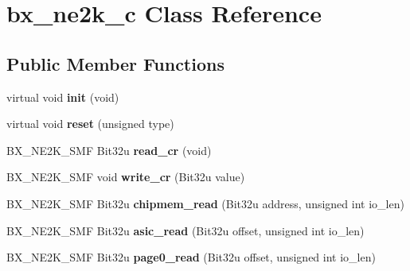 \hypertarget{classbx__ne2k__c}{\section{bx\-\_\-ne2k\-\_\-c Class Reference}
\label{classbx__ne2k__c}
}
\subsection*{Public Member Functions}
\begin{DoxyCompactItemize}
\item 
\hypertarget{classbx__ne2k__c_ae7dce10cbb81edb33cd4079159432732}{virtual void {\bfseries init} (void)}\label{classbx__ne2k__c_ae7dce10cbb81edb33cd4079159432732}

\item 
\hypertarget{classbx__ne2k__c_a304c7130e8fdb026351c4b57e11cb70d}{virtual void {\bfseries reset} (unsigned type)}\label{classbx__ne2k__c_a304c7130e8fdb026351c4b57e11cb70d}

\item 
\hypertarget{classbx__ne2k__c_a369a3b1b0ee2d349c7e19a565a0b1b2b}{B\-X\-\_\-\-N\-E2\-K\-\_\-\-S\-M\-F Bit32u {\bfseries read\-\_\-cr} (void)}\label{classbx__ne2k__c_a369a3b1b0ee2d349c7e19a565a0b1b2b}

\item 
\hypertarget{classbx__ne2k__c_a00b04f4ca72d07587393521b1e8b23c6}{B\-X\-\_\-\-N\-E2\-K\-\_\-\-S\-M\-F void {\bfseries write\-\_\-cr} (Bit32u value)}\label{classbx__ne2k__c_a00b04f4ca72d07587393521b1e8b23c6}

\item 
\hypertarget{classbx__ne2k__c_abd68d09980f29a3eb8a5ccc2269df379}{B\-X\-\_\-\-N\-E2\-K\-\_\-\-S\-M\-F Bit32u {\bfseries chipmem\-\_\-read} (Bit32u address, unsigned int io\-\_\-len)}\label{classbx__ne2k__c_abd68d09980f29a3eb8a5ccc2269df379}

\item 
\hypertarget{classbx__ne2k__c_a630285e316f5ce68784560967b595421}{B\-X\-\_\-\-N\-E2\-K\-\_\-\-S\-M\-F Bit32u {\bfseries asic\-\_\-read} (Bit32u offset, unsigned int io\-\_\-len)}\label{classbx__ne2k__c_a630285e316f5ce68784560967b595421}

\item 
\hypertarget{classbx__ne2k__c_a320a833373a10e26c973ff92c2aa14c4}{B\-X\-\_\-\-N\-E2\-K\-\_\-\-S\-M\-F Bit32u {\bfseries page0\-\_\-read} (Bit32u offset, unsigned int io\-\_\-len)}\label{classbx__ne2k__c_a320a833373a10e26c973ff92c2aa14c4}


\end{DoxyCompactItemize}
